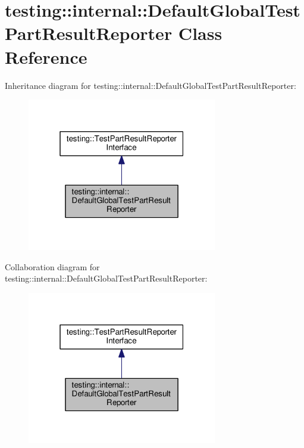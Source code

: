 \hypertarget{classtesting_1_1internal_1_1DefaultGlobalTestPartResultReporter}{}\section{testing\+:\+:internal\+:\+:Default\+Global\+Test\+Part\+Result\+Reporter Class Reference}
\label{classtesting_1_1internal_1_1DefaultGlobalTestPartResultReporter}


Inheritance diagram for testing\+:\+:internal\+:\+:Default\+Global\+Test\+Part\+Result\+Reporter\+:\nopagebreak
\begin{figure}[H]
\begin{center}
\leavevmode
\includegraphics[width=235pt]{classtesting_1_1internal_1_1DefaultGlobalTestPartResultReporter__inherit__graph}
\end{center}
\end{figure}


Collaboration diagram for testing\+:\+:internal\+:\+:Default\+Global\+Test\+Part\+Result\+Reporter\+:\nopagebreak
\begin{figure}[H]
\begin{center}
\leavevmode
\includegraphics[width=235pt]{classtesting_1_1internal_1_1DefaultGlobalTestPartResultReporter__coll__graph}
\end{center}
\end{figure}
